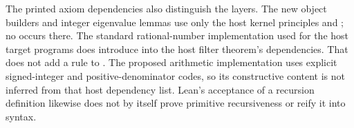 The printed axiom dependencies also distinguish the layers. The new
object builders and integer eigenvalue lemmas use only the host kernel
principles  and ; no
 occurs there. The standard rational-number
implementation used for the host target programs does introduce
 into the host filter theorem's dependencies.
That does not add a rule to . The proposed arithmetic
implementation uses explicit signed-integer and positive-denominator
codes, so its constructive content is not inferred from that host
dependency list. Lean's acceptance of a recursion definition likewise
does not by itself prove primitive recursiveness or reify it into
 syntax.
